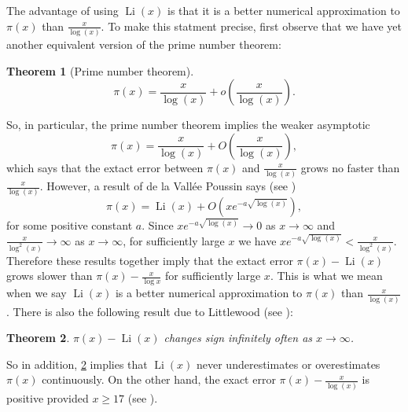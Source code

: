 \documentclass[12pt]{book}
\newtheorem{theorem}{Theorem}[section]
\theoremstyle{definition}\newframedtheorem{method}{Method}
\newcommand{\<}{\langle}
\renewcommand{\>}{\rangle}
\DeclareMathOperator{\Li}{\mathrm{Li}}
\begin{document}
      The advantage of using $\Li(x)$ is that it is a better numerical approximation to $\pi(x)$ than $\frac{x}{\log(x)}$. To make this statment precise, first observe that we have yet another equivalent version of the prime number theorem:

      \begin{theorem}[Prime number theorem]
        \phantom{ }
        \[
          \pi(x) = \frac{x}{\log(x)}+o\left(\frac{x}{\log(x)}\right).
        \]
      \end{theorem}

      So, in particular, the prime number theorem implies the weaker asymptotic
      \[
        \pi(x) = \frac{x}{\log(x)}+O\left(\frac{x}{\log(x)}\right),
      \]
      which says that the extact error between $\pi(x)$ and $\frac{x}{\log(x)}$ grows no faster than $\frac{x}{\log(x)}$. However, a result of de la Vall\'ee Poussin says (see \cite{poussin1899fonction})
      \[
        \pi(x) = \Li(x)+O\left(xe^{-a\sqrt{\log(x)}}\right),
      \]
      for some positive constant $a$. Since $xe^{-a\sqrt{\log(x)}} \to 0$ as $x \to \infty$ and $\frac{x}{\log^{2}(x)} \to \infty$ as $x \to \infty$, for sufficiently large $x$ we have $xe^{-a\sqrt{\log(x)}} < \frac{x}{\log^{2}(x)}$. Therefore these results together imply that the extact error $\pi(x)-\Li(x)$ grows slower than $\pi(x)-\frac{x}{\log{x}}$ for sufficiently large $x$. This is what we mean when we say $\Li(x)$ is a better numerical approximation to $\pi(x)$ than $\frac{x}{\log(x)}$. There is also the following result due to Littlewood (see \cite{littlewood1914distribution}):

      \begin{theorem}\label{thm:Littlewood_Li_approximation_theorem}
        $\pi(x)-\Li(x)$ changes sign infinitely often as $x \to \infty$.
      \end{theorem}

      So in addition, \cref{thm:Littlewood_Li_approximation_theorem} implies that $\Li(x)$ never underestimates or overestimates $\pi(x)$ continuously. On the other hand, the exact error $\pi(x)-\frac{x}{\log(x)}$ is positive provided $x \ge 17$ (see \cite{rosser1962approximate}).
\end{document}
